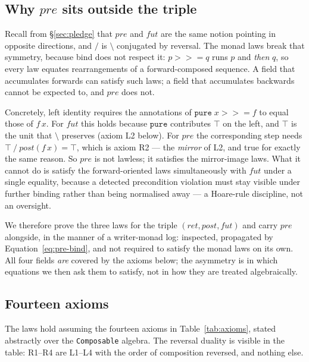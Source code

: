 \documentclass[acmsmall,screen]{acmart}
\newcommand{\pre}{\mathit{pre}}
\newcommand{\post}{\mathit{post}}
\newcommand{\fut}{\mathit{fut}}
\newcommand{\ret}{\mathit{ret}}
\newcommand{\lquot}{\mathbin{\setminus}}   %
\newcommand{\rquot}{\mathbin{/}}           %
\begin{document}
\subsection{Why \texorpdfstring{$\pre$}{pre} sits outside the triple}
\label{sec:orientation}

Recall from \S\ref{sec:pledge} that $\pre$ and $\fut$ are the same notion
pointing in opposite directions, and $\rquot$ is $\lquot$ conjugated by
reversal.
The monad laws break that symmetry, because bind does not respect it:
$p \mathbin{>\!\!>\!\!=} q$ runs $p$ and \emph{then} $q$, so every law
equates rearrangements of a forward-composed sequence.
A field that accumulates forwards can satisfy such laws; a field that
accumulates backwards cannot be expected to, and $\pre$ does not.

Concretely, left identity requires the annotations of
$\mathtt{pure}\;x \mathbin{>\!\!>\!\!=} f$ to equal those of $f\,x$.
For $\fut$ this holds because $\mathtt{pure}$ contributes $\top$ on the
left, and $\top$ is the unit that $\lquot$ preserves (axiom L2 below).
For $\pre$ the corresponding step needs $\top \rquot \post(f\,x) = \top$,
which is axiom R2 --- the \emph{mirror} of L2, and true for exactly the
same reason.
So $\pre$ is not lawless; it satisfies the mirror-image laws.
What it cannot do is satisfy the forward-oriented laws simultaneously with
$\fut$ under a single equality, because a detected precondition violation
must stay visible under further binding rather than being normalised away
--- a Hoare-rule discipline, not an oversight.

We therefore prove the three laws for the triple $(\ret, \post, \fut)$ and
carry $\pre$ alongside, in the manner of a writer-monad log: inspected,
propagated by Equation~\eqref{eq:pre-bind}, and not required to satisfy the
monad laws on its own.
All four fields \emph{are} covered by the axioms below; the asymmetry is in
which equations we then ask them to satisfy, not in how they are treated
algebraically.

\subsection{Fourteen axioms}
\label{sec:axioms}

The laws hold assuming the fourteen axioms in Table~\ref{tab:axioms},
stated abstractly over the \lstinline{Composable} algebra.
The reversal duality is visible in the table: R1--R4 are L1--L4 with the
order of composition reversed, and nothing else.
\end{document}
